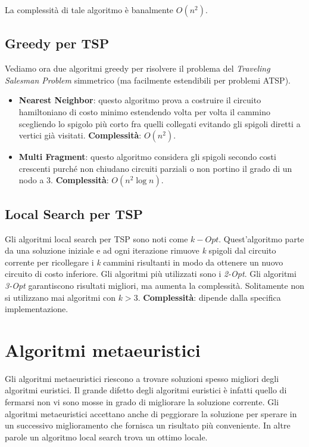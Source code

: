 \documentclass[11pt, oneside]{book}
\begin{document}
\par\bigskip

La complessit\`a di tale algoritmo \`e banalmente $O(n^2)$.

\subsection{Greedy per TSP}

Vediamo ora due algoritmi greedy per risolvere il problema del {\em
  Traveling Salesman Problem} simmetrico (ma facilmente estendibili
per problemi ATSP).

\begin{itemize}
  
\item {\bf Nearest Neighbor}: questo algoritmo prova a costruire il
  circuito hamiltoniano di costo minimo estendendo volta per volta il
  cammino scegliendo lo spigolo pi\`u corto fra quelli collegati
  evitando gli spigoli diretti a vertici gi\`a visitati. {\bf
    Complessit\`a}: $O(n^2)$.

\item {\bf Multi Fragment}: questo algoritmo considera gli spigoli
  secondo costi crescenti purch\'e non chiudano circuiti parziali o
  non portino il grado di un nodo a 3. {\bf Complessit\`a}: $O(n^2
  \log{n})$.

\end{itemize}

\subsection{Local Search per TSP}

Gli algoritmi local search per TSP sono noti come
$k-Opt$. Quest'algoritmo parte da una soluzione iniziale e ad ogni
iterazione rimuove {\em k} spigoli dal circuito corrente per
ricollegare i {\em k} cammini risultanti in modo da ottenere un nuovo
circuito di costo inferiore. Gli algoritmi pi\`u utilizzati sono i
{\em 2-Opt}. Gli algoritmi {\em 3-Opt} garantiscono risultati
migliori, ma aumenta la complessit\`a. Solitamente non si utilizzano
mai algoritmi con $k > 3$. {\bf Complessit\`a}: dipende dalla
specifica implementazione.

\section{Algoritmi metaeuristici}

Gli algoritmi metaeuristici riescono a trovare soluzioni spesso
migliori degli algoritmi euristici. Il grande difetto degli algoritmi
euristici \`e infatti quello di fermarsi non vi sono mosse in grado di
migliorare la soluzione corrente. Gli algoritmi metaeuristici
accettano anche di peggiorare la soluzione per sperare in un
successivo miglioramento che fornisca un risultato pi\`u
conveniente. In altre parole un algoritmo local search trova un ottimo
locale.
\end{document}
